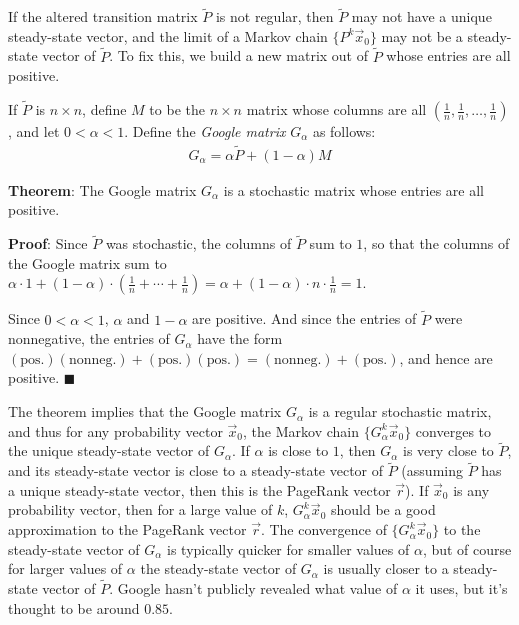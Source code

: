 \documentclass{article}
\begin{document}
If the altered transition matrix $\widetilde{P}$ is not regular, then $\widetilde{P}$ may not have a unique steady-state vector, and the limit of a Markov chain $\{P^k\vec{x}_0\}$ may not be a steady-state vector of $\widetilde{P}$. To fix this, we build a new matrix out of $\widetilde{P}$ whose entries are all positive.

If $\widetilde{P}$ is $n \times n$, define $M$ to be the $n \times n$ matrix whose columns are all $(\frac{1}{n}, \frac{1}{n}, \ldots, \frac{1}{n})$, and let $0 < \alpha < 1$. Define the \emph{Google matrix} $G_\alpha$ as follows:
\begin{align*}
  G_\alpha = \alpha\widetilde{P} + (1 - \alpha)M
\end{align*}

\textbf{Theorem}: The Google matrix $G_\alpha$ is a stochastic matrix whose entries are all positive.

\textbf{Proof}: Since $\widetilde{P}$ was stochastic, the columns of $\widetilde{P}$ sum to $1$, so that the columns of the Google matrix sum to $\alpha \cdot 1 + (1 - \alpha) \cdot (\frac{1}{n} + \cdots + \frac{1}{n}) = \alpha + (1 - \alpha) \cdot n \cdot \frac{1}{n} = 1$.

Since $0 < \alpha < 1$, $\alpha$ and $1 - \alpha$ are positive. And since the entries of $\widetilde{P}$ were nonnegative, the entries of $G_\alpha$ have the form $(\text{pos.})(\text{nonneg.}) + (\text{pos.})(\text{pos.}) = (\text{nonneg.}) + (\text{pos.})$, and hence are positive. \hfill $\blacksquare$

The theorem implies that the Google matrix $G_\alpha$ is a regular stochastic matrix, and thus for any probability vector $\vec{x}_0$, the Markov chain $\{G_\alpha^k\vec{x}_0\}$ converges to the unique steady-state vector of $G_\alpha$. If $\alpha$ is close to $1$, then $G_\alpha$ is very close to $\widetilde{P}$, and its steady-state vector is close to a steady-state vector of $\widetilde{P}$ (assuming $\widetilde{P}$ has a unique steady-state vector, then this is the PageRank vector $\vec{r}$). If $\vec{x}_0$ is any probability vector, then for a large value of $k$, $G_\alpha^k\vec{x}_0$ should be a good approximation to the PageRank vector $\vec{r}$. The convergence of $\{G_\alpha^k\vec{x}_0\}$ to the steady-state vector of $G_\alpha$ is typically quicker for smaller values of $\alpha$, but of course for larger values of $\alpha$ the steady-state vector of $G_\alpha$ is usually closer to a steady-state vector of $\widetilde{P}$. Google hasn't publicly revealed what value of $\alpha$ it uses, but it's thought to be around $0.85$.
\end{document}
